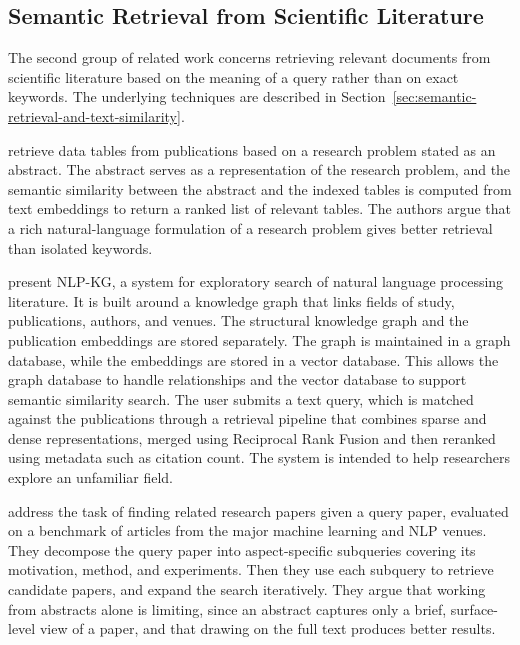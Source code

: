 \subsection{Semantic Retrieval from Scientific Literature}
\label{sec:semantic-retrieval-from-scientific-literature}

The second group of related work concerns retrieving relevant 
documents from scientific literature based on the meaning of a 
query rather than on exact keywords. The underlying techniques 
are described in 
Section~\ref{sec:semantic-retrieval-and-text-similarity}.

\textcite{berenguer2024retrieve_data_from_research} retrieve 
data tables from publications based on a research problem 
stated as an abstract. The abstract serves as a representation 
of the research problem, and the semantic similarity between 
the abstract and the indexed tables is computed from text 
embeddings to return a ranked list of relevant tables. The 
authors argue that a rich natural-language formulation of a 
research problem gives better retrieval than isolated 
keywords.

\textcite{schopf2024nlp} present NLP-KG, a system for 
exploratory search of natural language processing literature. 
It is built around a knowledge graph that links fields of 
study, publications, authors, and venues. 
The structural knowledge graph and the publication 
embeddings are stored separately. The graph is maintained 
in a graph database, while the embeddings are stored in 
a vector database. This allows the graph database to handle 
relationships and the vector database to support semantic 
similarity search. The user 
submits a text query, which is matched against the publications 
through a retrieval pipeline that combines sparse and dense 
representations, merged using Reciprocal Rank Fusion and then 
reranked using metadata such as citation count. The system is 
intended to help researchers explore an unfamiliar field.

\textcite{park2026chain_of_retrieval} address the task of 
finding related research papers given a query paper, evaluated 
on a benchmark of articles from the major machine learning and 
NLP venues. They decompose the query paper into aspect-specific 
subqueries covering its motivation, method, and experiments.
Then they use each subquery to retrieve candidate papers, and expand the 
search iteratively. They argue that working from abstracts alone 
is limiting, since an abstract captures only a brief, surface-level 
view of a paper, and that drawing on the full text produces better 
results.

